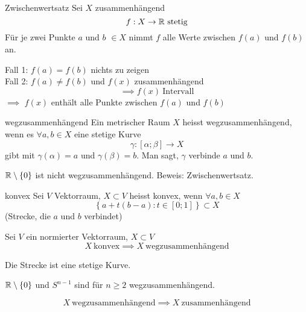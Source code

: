 \begin{Sat}{Zwischenwertsatz}
  Sei $X$ zusammenhängend
  \[f:X\to\mb{R}\ \text{stetig}\]
  Für je zwei Punkte $a$ und $b$ $\in X$ nimmt $f$ alle Werte zwischen $f(a)$ und $f(b)$ an.
\end{Sat}
\begin{Bew}
  Fall 1: $f(a)=f(b)$ nichts zu zeigen\\
  Fall 2: $f(a)\neq f(b)$ und $f(x)$ zusammenhängend
  \[\implies f(x)\ \text{Intervall}\]
  $\implies$ $f(x)$ enthält alle Punkte zwischen $f(a)$ und $f(b)$
\end{Bew}
\begin{Def}{wegzusammenhängend}
  Ein metrischer Raum $X$ heisst wegzusammenhängend, wenn es $\forall a,b\in X$ eine stetige Kurve
  \[\gamma:[\alpha;\beta]\to X\]
  gibt mit $\gamma(\alpha)=a$ und $\gamma(\beta)=b$. Man sagt, $\gamma$ verbinde $a$ und $b$.
\end{Def}
\begin{Bsp}
  $\mathbb{R}\setminus\left\{ 0 \right\}$ ist nicht wegzusammenhängend. Beweis: Zwischenwertsatz.
\end{Bsp}
\begin{Def}{konvex}
  Sei $V$ Vektorraum, $X\subset V$ heisst konvex, wenn $\forall a,b\in X$
  \[\left\{ a+t(b-a):t\in [0;1] \right\}\subset X\]
  (Strecke, die $a$ und $b$ verbindet)
\end{Def}
\begin{Lem}
  Sei $V$ ein normierter Vektorraum, $X\subset V$
  \[X\ \text{konvex}\implies X\ \text{wegzusammenhängend}\]
\end{Lem}
\begin{Bew}
  Die Strecke ist eine stetige Kurve.
\end{Bew}
\begin{Sat}
  $\mathbb{R}\setminus\left\{ 0 \right\}$ und $S^{n-1}$ sind für $n\geq 2$ wegzusammenhängend.
\end{Sat}
\begin{Lem}
  \[X\ \text{wegzusammenhängend} \implies X\ \text{zusammenhängend}\]
\end{Lem}
